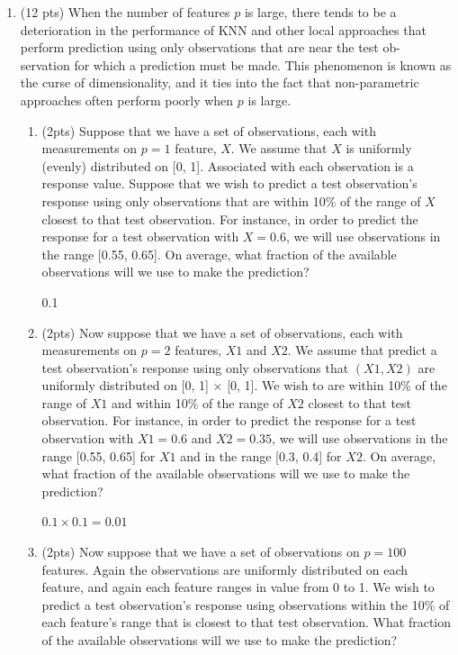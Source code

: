 \documentclass[a4paper]{article}
\theoremstyle{definition}
\newenvironment{soln}{
    \leavevmode\color{blue}\ignorespaces
}{}
\begin{document}
\begin{enumerate}
\begin{enumerate}
	      \end{enumerate}

				\pagebreak
	\item (12 pts) When the number of features $p$ is large, there tends to be a deterioration in the performance of KNN and other local approaches that perform prediction using only observations that are near the test ob- servation for which a prediction must be made. This phenomenon is known as the curse of dimensionality, and it ties into the fact that non-parametric approaches often perform poorly when $p$ is large.

	      \begin{enumerate}
		      \item (2pts) Suppose that we have a set of observations, each with measurements on $p=1$ feature, $X$. We assume that $X$ is uniformly (evenly) distributed on [0, 1]. Associated with each observation is a response value. Suppose that we wish to predict a test observation’s response using only observations that are within 10\% of the range of $X$ closest to that test observation. For instance, in order to predict the response for a test observation with $X=0.6$, we will use observations in the range [0.55, 0.65]. On average, what fraction of the available observations will we use to make the prediction?

		            \begin{soln}
			            0.1
		            \end{soln}


		      \item (2pts) Now suppose that we have a set of observations, each with measurements on $p =2$ features, $X1$ and $X2$. We assume that predict a test observation’s response using only observations that $(X1,X2)$ are uniformly distributed on [0, 1] × [0, 1]. We wish to are within 10\% of the range of $X1$ and within 10\% of the range of $X2$ closest to that test observation. For instance, in order to predict the response for a test observation with $X1 =0.6$ and $X2 =0.35$, we will use observations in the range [0.55, 0.65] for $X1$ and in the range [0.3, 0.4] for $X2$. On average, what fraction of the available observations will we use to make the prediction?

		            \begin{soln}
			            $0.1 \times 0.1 = 0.01$
		            \end{soln}

		      \item (2pts) Now suppose that we have a set of observations on $p = 100$ features. Again the observations are uniformly distributed on each feature, and again each feature ranges in value from 0 to 1. We wish to predict a test observation’s response using observations within the 10\% of each feature’s range that is closest to that test observation. What fraction of the available observations will we use to make the prediction?


\end{enumerate}
\end{enumerate}
\end{document}
